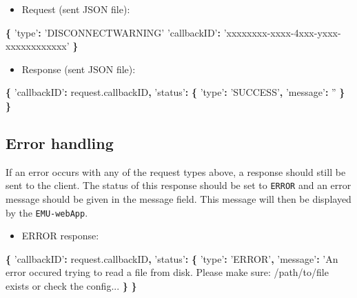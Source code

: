 \documentclass[]{book}
\newenvironment{Shaded}{\begin{snugshade}}{\end{snugshade}}
\newcommand{\AttributeTok}[1]{\textcolor[rgb]{0.77,0.63,0.00}{#1}}
\newcommand{\NormalTok}[1]{#1}
\newcommand{\OperatorTok}[1]{\textcolor[rgb]{0.81,0.36,0.00}{\textbf{#1}}}
\newcommand{\StringTok}[1]{\textcolor[rgb]{0.31,0.60,0.02}{#1}}
\newcommand{\VariableTok}[1]{\textcolor[rgb]{0.00,0.00,0.00}{#1}}
\providecommand{\tightlist}{%
  \setlength{\itemsep}{0pt}\setlength{\parskip}{0pt}}
\theoremstyle{definition}
\theoremstyle{definition}
\theoremstyle{definition}
\theoremstyle{remark}
\begin{document}
\begin{itemize}
\tightlist
\item
  Request (sent JSON file):
\end{itemize}

\begin{Shaded}
\begin{Highlighting}[]
\OperatorTok{\{}
  \StringTok{'type'}\OperatorTok{:} \StringTok{'DISCONNECTWARNING'}
  \StringTok{'callbackID'}\OperatorTok{:} \StringTok{'xxxxxxxx-xxxx-4xxx-yxxx-xxxxxxxxxxxx'}
\OperatorTok{\}}
\end{Highlighting}
\end{Shaded}

\begin{itemize}
\tightlist
\item
  Response (sent JSON file):
\end{itemize}

\begin{Shaded}
\begin{Highlighting}[]
\OperatorTok{\{}
  \StringTok{'callbackID'}\OperatorTok{:} \VariableTok{request}\NormalTok{.}\AttributeTok{callbackID}\OperatorTok{,}
  \StringTok{'status'}\OperatorTok{:} \OperatorTok{\{}
    \StringTok{'type'}\OperatorTok{:} \StringTok{'SUCCESS'}\OperatorTok{,}
    \StringTok{'message'}\OperatorTok{:} \StringTok{''}
  \OperatorTok{\}}
\OperatorTok{\}}
\end{Highlighting}
\end{Shaded}

\hypertarget{error-handling}{%
\subsection{Error handling}\label{error-handling}}

If an error occurs with any of the request types above, a response
should still be sent to the client. The status of this response should
be set to \texttt{ERROR} and an error message should be given in the
message field. This message will then be displayed by the
\texttt{EMU-webApp}.

\begin{itemize}
\tightlist
\item
  ERROR response:
\end{itemize}

\begin{Shaded}
\begin{Highlighting}[]
\OperatorTok{\{}
  \StringTok{'callbackID'}\OperatorTok{:} \VariableTok{request}\NormalTok{.}\AttributeTok{callbackID}\OperatorTok{,}
  \StringTok{'status'}\OperatorTok{:} \OperatorTok{\{}
    \StringTok{'type'}\OperatorTok{:} \StringTok{'ERROR'}\OperatorTok{,}
    \StringTok{'message'}\OperatorTok{:} \StringTok{'An error occured trying to read a file from disk. Please make sure: /path/to/file exists or check the config...}
  \OperatorTok{\}}
\OperatorTok{\}}
\end{Highlighting}
\end{Shaded}
\end{document}
